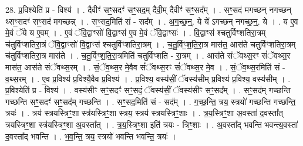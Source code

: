 \documentclass[17pt]{extarticle}
\begin{document}
28. प्र॒विश्येति॑ प्र - विश्य॑ । . दैवीꣳ॑ सꣳ॒॒सदꣳ॑ सꣳ॒॒सद॒म् दैवी॒म् दैवीꣳ॑ सꣳ॒॒सद᳚म् । . सꣳ॒॒सद॑ मगच्छन् नगच्छन् थ्सꣳ॒॒सदꣳ॑ सꣳ॒॒सद॑ मगच्छन्न् । . सꣳ॒॒सद॒मिति॑ सं - सद᳚म् । . अ॒ग॒च्छ॒न्॒. ये ये॑ ऽगच्छन् नगच्छ॒न्॒. ये । . य ए॒व मे॒वं ॅये य ए॒वम् । . ए॒वं ॅवि॒द्वाꣳसो॑ वि॒द्वाꣳस॑ ए॒व मे॒वं ॅवि॒द्वाꣳसः॑ । . वि॒द्वाꣳस॑ श्चतुर्विꣳशतिरा॒त्रम् च॑तुर्विꣳशतिरा॒त्रं ॅवि॒द्वाꣳसो॑ वि॒द्वाꣳस॑ श्चतुर्विꣳशतिरा॒त्रम् । . च॒तु॒र्विꣳ॒॒श॒ति॒रा॒त्र मास॑त॒ आस॑ते चतुर्विꣳशतिरा॒त्रम् च॑तुर्विꣳशतिरा॒त्र मास॑ते । . च॒तु॒र्विꣳ॒॒श॒ति॒रा॒त्रमिति॑ चतुर्विꣳशति - रा॒त्रम् । . आस॑ते संॅवथ्स॒रꣳ सं॑ॅवथ्स॒र मास॑त॒ आस॑ते संॅवथ्स॒रम् । . सं॒ॅव॒थ्स॒र मे॒वैव सं॑ॅवथ्स॒रꣳ सं॑ॅवथ्स॒र मे॒व । . सं॒ॅव॒थ्स॒रमिति॑ सं - व॒थ्स॒रम् । . ए॒व प्र॒विश्य॑ प्र॒विश्यै॒वैव प्र॒विश्य॑ । . प्र॒विश्य॒ वस्य॑सीं॒ ॅवस्य॑सीम् प्र॒विश्य॑ प्र॒विश्य॒ वस्य॑सीम् । . प्र॒विश्येति॑ प्र - विश्य॑ । . वस्य॑सीꣳ सꣳ॒॒सदꣳ॑ सꣳ॒॒सदं॒ ॅवस्य॑सीं॒ ॅवस्य॑सीꣳ सꣳ॒॒सद᳚म् । . सꣳ॒॒सद॑म् गच्छन्ति गच्छन्ति सꣳ॒॒सदꣳ॑ सꣳ॒॒सद॑म् गच्छन्ति । . सꣳ॒॒सद॒मिति॑ सं - सद᳚म् । . ग॒च्छ॒न्ति॒ त्रय॒ स्त्रयो॑ गच्छन्ति गच्छन्ति॒ त्रयः॑ । . त्रय॑ स्त्रयस्त्रिꣳ॒॒शा स्त्र॑यस्त्रिꣳ॒॒शा स्त्रय॒ स्त्रय॑ स्त्रयस्त्रिꣳ॒॒शाः । . त्र॒य॒स्त्रिꣳ॒॒शा अ॒वस्ता॑ द॒वस्ता᳚त् त्रयस्त्रिꣳ॒॒शा स्त्र॑यस्त्रिꣳ॒॒शा अ॒वस्ता᳚त् । . त्र॒य॒स्त्रिꣳ॒॒शा इति॑ त्रयः - त्रिꣳ॒॒शाः । . अ॒वस्ता᳚द् भवन्ति भवन्त्य॒वस्ता॑ द॒वस्ता᳚द् भवन्ति । . भ॒व॒न्ति॒ त्रय॒ स्त्रयो॑ भवन्ति भवन्ति॒ त्रयः॑ । \newline
\end{document}
